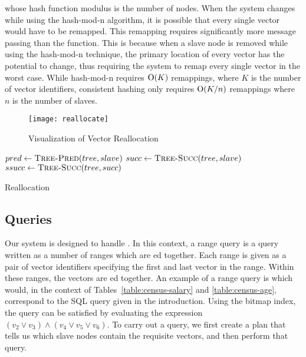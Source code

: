 whose hash function modulus is the number of nodes. When the system changes
while using the hash-mod-n algorithm, it is possible that every single vector
would have to be remapped. This remapping requires significantly more message
passing than the  function. This is because
when a slave node is removed while using the hash-mod-n technique, the primary
location of every vector has the potential to change, thus requiring the system to remap every
single vector in the worst case. \cite{kleppmann2017} While hash-mod-n requires
\(\mathrm{O}(K)\) remappings, where \(K\) is the number of vector identifiers, consistent
hashing only requires \(\mathrm{O}(K/n)\) remappings where \(n\) is the number of
slaves. \cite{karger1997}
%
\begin{figure}
    \centering
    \texttt{[image: reallocate]}
    \caption{Visualization of Vector Reallocation}
    \label{fig:vector-reallocation}
\end{figure}
%
\begin{algorithm}
    \begin{algorithmic}
            \State $pred \gets \Call{Tree-Pred}{tree, slave}$
            \State $succ \gets \Call{Tree-Succ}{tree, slave}$
            \State $ssucc \gets \Call{Tree-Succ}{tree, succ}$
                \State {}
            \EndFor
                \State {}
            \EndFor
            \State {}
        \EndProcedure
    \end{algorithmic}
    \caption{Reallocation}
    \label{alg:reallocate}
\end{algorithm}
%
\subsection{Queries}
Our system is designed to handle . In this context, a range
query is a query written as a number of ranges which are ed together.
Each range is given as a pair of vector identifiers specifying the first and
last vector in the range. Within these ranges, the vectors are ed
together. An example of a range query is  which would,
in the context of Tables~\ref{table:census-salary} and \ref{table:census-age},
correspond to the SQL query
 given in the introduction.
Using the bitmap index, the query can be satisfied by evaluating the expression
\((v_2 \lor v_3) \land (v_4 \lor v_5 \lor v_6)\).
To carry out a query, we first create a plan that tells us which slave nodes
contain the requisite vectors, and then perform that query.
%
